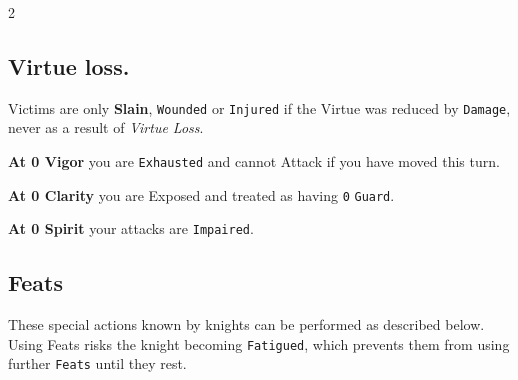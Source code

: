 \begin{multicols*}{2}
\label{sec:combat}

\subsection*{Virtue loss.}

Victims are only \textbf{Slain}, \texttt{Wounded} or \texttt{Injured} if the Virtue was reduced by \texttt{Damage}, never as a result of \emph{Virtue Loss}.

\textbf{At 0 Vigor} you are \texttt{Exhausted} and cannot Attack if you have moved this turn.

\textbf{At 0 Clarity} you are Exposed and treated as having \texttt{0} \texttt{Guard}.

\textbf{At 0 Spirit} your attacks are \texttt{Impaired}.

\subsection*{Feats}

These special actions known by knights can
be performed as described below. Using Feats
risks the knight becoming \texttt{Fatigued}, which
prevents them from using further \texttt{Feats} until
they rest.
\end{multicols*}

